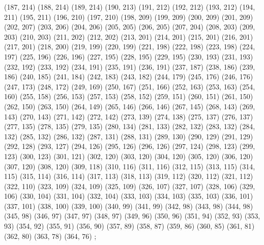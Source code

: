 {   (187, 214)
   (188, 214)
   (189, 214)
   (190, 213)
   (191, 212)
   (192, 212)
   (193, 212)
   (194, 211)
   (195, 211)
   (196, 210)
   (197, 210)
   (198, 209)
   (199, 209)
   (200, 209)
   (201, 209)
   (202, 207)
   (203, 206)
   (204, 206)
   (205, 205)
   (206, 205)
   (207, 204)
   (208, 203)
   (209, 203)
   (210, 203)
   (211, 202)
   (212, 202)
   (213, 201)
   (214, 201)
   (215, 201)
   (216, 201)
   (217, 201)
   (218, 200)
   (219, 199)
   (220, 199)
   (221, 198)
   (222, 198)
   (223, 198)
   (224, 197)
   (225, 196)
   (226, 196)
   (227, 195)
   (228, 195)
   (229, 195)
   (230, 193)
   (231, 193)
   (232, 192)
   (233, 192)
   (234, 191)
   (235, 191)
   (236, 191)
   (237, 187)
   (238, 186)
   (239, 186)
   (240, 185)
   (241, 184)
   (242, 183)
   (243, 182)
   (244, 179)
   (245, 176)
   (246, 176)
   (247, 173)
   (248, 172)
   (249, 169)
   (250, 167)
   (251, 166)
   (252, 163)
   (253, 163)
   (254, 160)
   (255, 158)
   (256, 153)
   (257, 153)
   (258, 152)
   (259, 151)
   (260, 151)
   (261, 150)
   (262, 150)
   (263, 150)
   (264, 149)
   (265, 146)
   (266, 146)
   (267, 145)
   (268, 143)
   (269, 143)
   (270, 143)
   (271, 142)
   (272, 142)
   (273, 139)
   (274, 138)
   (275, 137)
   (276, 137)
   (277, 135)
   (278, 135)
   (279, 135)
   (280, 134)
   (281, 133)
   (282, 132)
   (283, 132)
   (284, 132)
   (285, 132)
   (286, 132)
   (287, 131)
   (288, 131)
   (289, 130)
   (290, 129)
   (291, 129)
   (292, 128)
   (293, 127)
   (294, 126)
   (295, 126)
   (296, 126)
   (297, 124)
   (298, 123)
   (299, 123)
   (300, 123)
   (301, 121)
   (302, 120)
   (303, 120)
   (304, 120)
   (305, 120)
   (306, 120)
   (307, 120)
   (308, 120)
   (309, 118)
   (310, 116)
   (311, 116)
   (312, 115)
   (313, 115)
   (314, 115)
   (315, 114)
   (316, 114)
   (317, 113)
   (318, 113)
   (319, 112)
   (320, 112)
   (321, 112)
   (322, 110)
   (323, 109)
   (324, 109)
   (325, 109)
   (326, 107)
   (327, 107)
   (328, 106)
   (329, 106)
   (330, 104)
   (331, 104)
   (332, 104)
   (333, 103)
   (334, 103)
   (335, 103)
   (336, 101)
   (337, 101)
   (338, 100)
   (339, 100)
   (340, 99)
   (341, 99)
   (342, 98)
   (343, 98)
   (344, 98)
   (345, 98)
   (346, 97)
   (347, 97)
   (348, 97)
   (349, 96)
   (350, 96)
   (351, 94)
   (352, 93)
   (353, 93)
   (354, 92)
   (355, 91)
   (356, 90)
   (357, 89)
   (358, 87)
   (359, 86)
   (360, 85)
   (361, 81)
   (362, 80)
   (363, 78)
   (364, 76)
} ;